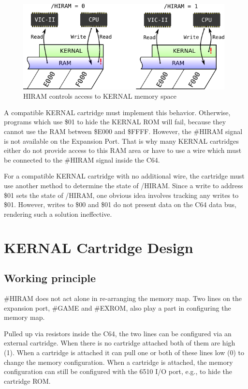 \documentclass[a4paper]{memoir}
\begin{document}
\begin{figure}
    \centering
    \includegraphics[width=11cm]{src/memory-map-hiram}
    \caption{HIRAM controls access to KERNAL memory space}
    \label{fig:memory-map-hiram}
\end{figure}

A compatible KERNAL cartridge must implement this behavior.
Otherwise, programs which use \$01 to hide the KERNAL ROM will fail,
because they cannot use the RAM between \$E000 and \$FFFF. However,
the \#HIRAM signal is not available on the Expansion Port. That is why
many KERNAL cartridges either do not provide access to this RAM area
or have to use a wire which must be connected to the \#HIRAM signal
inside the C64.

For a compatible KERNAL cartridge with no additional wire, the
cartridge must use another method to determine the state of /HIRAM.
Since a write to address \$01 sets the state of /HIRAM, one obvious
idea involves tracking any writes to \$01. However, writes to \$00
and \$01 do not present data on the C64 data bus, rendering such a
solution ineffective.

\chapter{KERNAL Cartridge Design}

\section{Working principle}

\#HIRAM does not act alone in re-arranging the memory map. Two lines
on the expansion port, \#GAME and \#EXROM, also play a part in
configuring the memory map.

Pulled up via resistors inside the C64, the two lines can be
configured via an external cartridge. When there is no cartridge
attached both of them are high (1). When a cartridge is attached it
can pull one or both of these lines low (0) to change the memory
configuration. When a cartridge is attached, the memory
configuration can still be configured with the 6510 I/O port, e.g.,
to hide the cartridge ROM.
\end{document}

